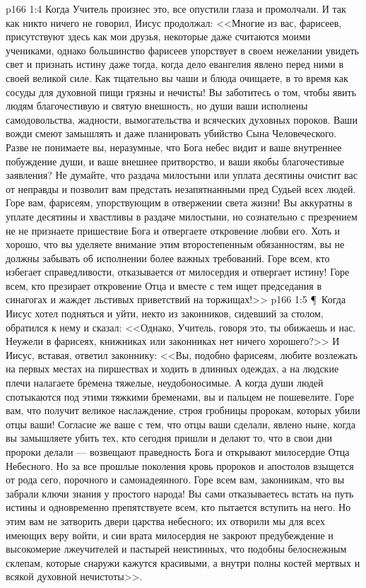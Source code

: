 \vs p166 1:4 Когда Учитель произнес это, все опустили глаза и промолчали. И так как никто ничего не говорил, Иисус продолжал: <<Многие из вас, фарисеев, присутствуют здесь как мои друзья, некоторые даже считаются моими учениками, однако большинство фарисеев упорствует в своем нежелании увидеть свет и признать истину даже тогда, когда дело евангелия явлено перед ними в своей великой силе. Как тщательно вы чаши и блюда очищаете, в то время как сосуды для духовной пищи грязны и нечисты! Вы заботитесь о том, чтобы явить людям благочестивую и святую внешность, но души ваши исполнены самодовольства, жадности, вымогательства и всяческих духовных пороков. Ваши вожди смеют замышлять и даже планировать убийство Сына Человеческого. Разве не понимаете вы, неразумные, что Бога небес видит и ваше внутреннее побуждение души, и ваше внешнее притворство, и ваши якобы благочестивые заявления? Не думайте, что раздача милостыни или уплата десятины очистит вас от неправды и позволит вам предстать незапятнанными пред Судьей всех людей. Горе вам, фарисеям, упорствующим в отвержении света жизни! Вы аккуратны в уплате десятины и хвастливы в раздаче милостыни, но сознательно с презрением не не признаете пришествие Бога и отвергаете откровение любви его. Хоть и хорошо, что вы уделяете внимание этим второстепенным обязанностям, вы не должны забывать об исполнении более важных требований. Горе всем, кто избегает справедливости, отказывается от милосердия и отвергает истину! Горе всем, кто презирает откровение Отца и вместе с тем ищет председания в синагогах и жаждет льстивых приветствий на торжищах!>>
\vs p166 1:5 \P\ Когда Иисус хотел подняться и уйти, некто из законников, сидевший за столом, обратился к нему и сказал: <<Однако, Учитель, говоря это, ты обижаешь и нас. Неужели в фарисеях, книжниках или законниках нет ничего хорошего?>> И Иисус, вставая, ответил законнику: <<Вы, подобно фарисеям, любите возлежать на первых местах на пиршествах и ходить в длинных одеждах, а на людские плечи налагаете бремена тяжелые, неудобоносимые. А когда души людей спотыкаются под этими тяжкими бременами, вы и пальцем не пошевелите. Горе вам, что получит великое наслаждение, строя гробницы пророкам, которых убили отцы ваши! Согласие же ваше с тем, что отцы ваши сделали, явлено ныне, когда вы замышляете убить тех, кто сегодня пришли и делают то, что в свои дни пророки делали --- возвещают праведность Бога и открывают милосердие Отца Небесного. Но за все прошлые поколения кровь пророков и апостолов взыщется от рода сего, порочного и самонадеянного. Горе всем вам, законникам, что вы забрали ключи знания у простого народа! Вы сами отказываетесь встать на путь истины и одновременно препятствуете всем, кто пытается вступить на него. Но этим вам не затворить двери царства небесного; их отворили мы для всех имеющих веру войти, и сии врата милосердия не закроют предубеждение и высокомерие лжеучителей и пастырей неистинных, что подобны белоснежным склепам, которые снаружи кажутся красивыми, а внутри полны костей мертвых и всякой духовной нечистоты>>.
